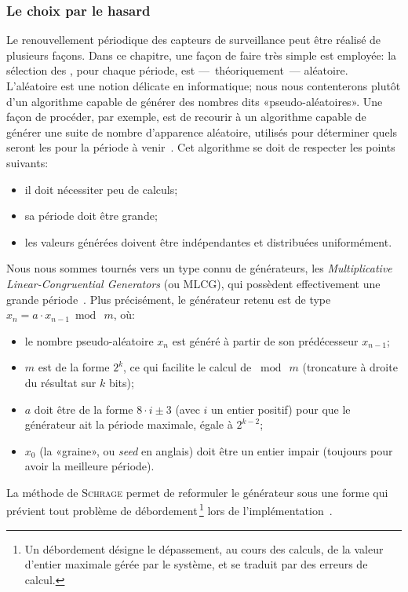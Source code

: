         \subsubsection{Le choix par le hasard}
Le renouvellement périodique des capteurs de surveillance peut être réalisé de plusieurs façons.
Dans ce chapitre, une façon de faire très simple est employée: la sélection des \cns, pour chaque période, est ---~théoriquement~--- aléatoire.
L'aléatoire est une notion délicate en informatique; nous nous contenterons plutôt d'un algorithme capable de générer des nombres dits «pseudo-aléatoires».
Une façon de procéder, par exemple, est de recourir à un algorithme capable de générer une suite de nombre d'apparence aléatoire, utilisés pour déterminer quels seront les \cns pour la période à venir~\cite{BMM13}.
Cet algorithme se doit de respecter les points suivants:
\begin{itemize}
    \item il doit nécessiter peu de calculs;
    \item sa période doit être grande;
    \item les valeurs générées doivent être indépendantes et distribuées uniformément.
\end{itemize}
Nous nous sommes tournés vers un type connu de générateurs, les \textit{Multiplicative Linear-Congruential Generators} (ou MLCG), qui possèdent effectivement une grande période~\cite{RJ91}.
Plus précisément, le générateur retenu est de type $x_n = a\cdot x_{n-1}\bmod\ m$, où:
\begin{itemize}
    \item le nombre pseudo-aléatoire $x_n$ est généré à partir de son prédécesseur $x_{n-1}$;
    \item $m$ est de la forme $2^k$, ce qui facilite le calcul de $\bmod\ m$ (troncature à droite du résultat sur $k$ bits);
    \item $a$ doit être de la forme $8\cdot i\pm3$ (avec $i$ un entier positif) pour que le générateur ait la période maximale, égale à $2^{k-2}$;
    \item $x_0$ (la «graine», ou \textit{seed} en anglais) doit être un entier impair (toujours pour avoir la meilleure période).
\end{itemize}
La méthode de \textsc{Schrage} permet de reformuler le générateur sous une forme qui prévient tout problème de débordement\,\footnote{Un débordement désigne le dépassement, au cours des calculs, de la valeur d'entier maximale gérée par le système, et se traduit par des erreurs de calcul.} lors de l'implémentation~\cite{RJ91}.
